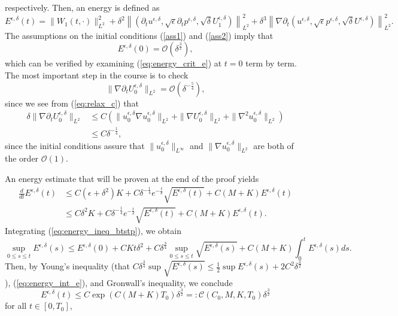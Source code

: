 \documentclass[reqno,10pt]{amsart}
\theoremstyle{definition}
\theoremstyle{remark}
\numberwithin{equation}{section}
\begin{document}
respectively. 
Then, an energy is defined as
\begin{equation} \label{eq:energy_crit_e}
    E^{\epsilon,\delta}(t) = \|W_1(t,\cdot)\|_{L^2}^2 + \delta^2 \left\| \left( \partial_t u^{\epsilon,\delta}, \sqrt\epsilon \partial_t p^{\epsilon,\delta}, \sqrt\delta U_1^{\epsilon,\delta} \right) \right\|_{L^2}^2 + \delta^3 \left\| \nabla\partial_t \left( u^{\epsilon,\delta}, \sqrt\epsilon p^{\epsilon,\delta}, \sqrt\delta U^{\epsilon,\delta} \right) \right\|_{L^2}^2.
\end{equation}
The assumptions on the initial conditions (\ref{ass1}) and (\ref{ass2}) imply that
\begin{equation} \label{eq:energy_int_e}
    E^{\epsilon,\delta}(0) = {\mathcal O}(\delta^{\frac{3}{2}}),
\end{equation}
which can be verified by examining (\ref{eq:energy_crit_e}) at $t=0$ term by term. The most important step in the course is to check
\begin{equation}  \label{eq:nabla_dt_U0}
    \|\nabla \partial_t U_0^{\epsilon,\delta}\|_{L^2} = \mathcal O(\delta^{-\frac{5}{4}}),
\end{equation}
since we see from (\ref{eq:relax_c}) that
\[
\begin{aligned}
    \delta \|\nabla \partial_t U_0^{\epsilon,\delta}\|_{L^2} 
    &\le C\left( \| u_0^{\epsilon,\delta}\nabla u_0^{\epsilon,\delta} \|_{L^2} + \|\nabla U_0^{\epsilon,\delta}\|_{L^2} + \|\nabla^2 u_0^{\epsilon,\delta}\|_{L^2} \right) \\
    &\le C\delta^{-\frac{1}{4}},
\end{aligned}
\]
since the initial conditions assure that $\|u_0^{\epsilon,\delta}\|_{L^\infty}$ and $\|\nabla u_0^{\epsilon,\delta}\|_{L^2}$ are both of the order $\mathcal O(1)$.

An energy estimate that will be proven at the end of the proof  yields
\begin{equation} \label{eq:energy_ineq_btstp}
\begin{split}
    \frac{d}{dt}E^{\epsilon,\delta}(t) 
    &\le C(\epsilon+\delta^2)K + C \delta^{-\frac{1}{4}}e^{-\frac{t}{\delta}} \sqrt{E^{\epsilon,\delta}(t)} + C(M+K)E^{\epsilon,\delta}(t) \\
    &\le C\delta^2K + C \delta^{-\frac{1}{4}}e^{-\frac{t}{\delta}} \sqrt{E^{\epsilon,\delta}(t)} + C(M+K)E^{\epsilon,\delta}(t).
\end{split}
\end{equation}
Integrating (\ref{eq:energy_ineq_btstp}), we obtain
\[
   \sup_{0\le s\le t}E^{\epsilon,\delta}(s) \le E^{\epsilon,\delta}(0) + CKt\delta^2 + C\delta^{\frac{3}{4}} \sup_{0\le s\le t} \sqrt{E^{\epsilon,\delta}(s)} + C(M+K) \int_0^t E^{\epsilon,\delta}(s) ds.
\]
Then, by Young's inequality (that $C\delta^{\frac{3}{4}} \sup \sqrt{E^{\epsilon,\delta}(s)}\le \frac{1}{2}  \sup E^{\epsilon,\delta}(s) + 2C^2\delta^{\frac{3}{2}}$), (\ref{eq:energy_int_e}), and Gronwall's inequality, we conclude
\begin{equation} \label{eq:energy_est_btstp}
    E^{\epsilon,\delta}(t) \le C\exp(C(M+K)T_0)\delta^{\frac{3}{2}} =:\mathcal C(C_0, M,K,T_0) \delta^{\frac{3}{2}}
\end{equation}
for all $t\in [0,T_0]$,
\end{document}
